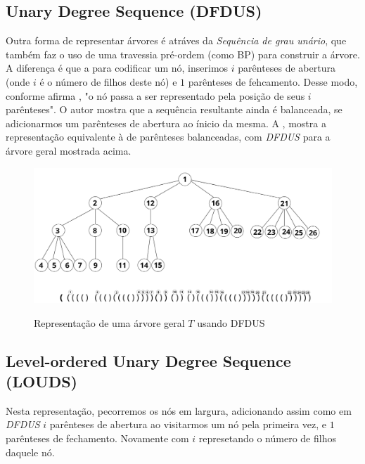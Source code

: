 \subsection{Unary Degree Sequence (DFDUS)}
Outra forma de representar árvores é atráves da \textit{Sequência de grau unário}, que também faz o uso de uma travessia pré-ordem (como BP) para construir a árvore.
A diferença é que a para codificar um nó, inserimos $i$ parênteses de abertura (onde $i$ é o número de filhos deste nó) e $1$ parênteses de fehcamento. 
Desse modo, conforme afirma \citeauthor{paper-succint-trees-in-practice}, "o nó passa a ser representado pela posição de seus $i$ parênteses". 
O autor mostra que a sequência resultante ainda é balanceada, se adicionarmos um parênteses de abertura ao ínicio da mesma. A , mostra a representação equivalente
à de parênteses balanceadas, com \textit{DFDUS} para  a árvore geral mostrada acima.
\begin{figure}[!ht]
    \centering
      \caption[Representação de árvores com Sequência de Grau Unário]{Representação de uma árvore geral $T$ usando DFDUS}
      \includegraphics[width=\columnwidth]{images/dfdus.png}
      \label{fig:dfdus-representation}
\end{figure}

\subsection{Level-ordered Unary Degree Sequence (LOUDS)}
Nesta representação, pecorremos os nós em largura, adicionando assim como em \textit{DFDUS} $i$ parênteses de abertura ao visitarmos um nó pela primeira vez, e $1$ parênteses de fechamento.
Novamente com $i$ represetando o número de filhos daquele nó.

